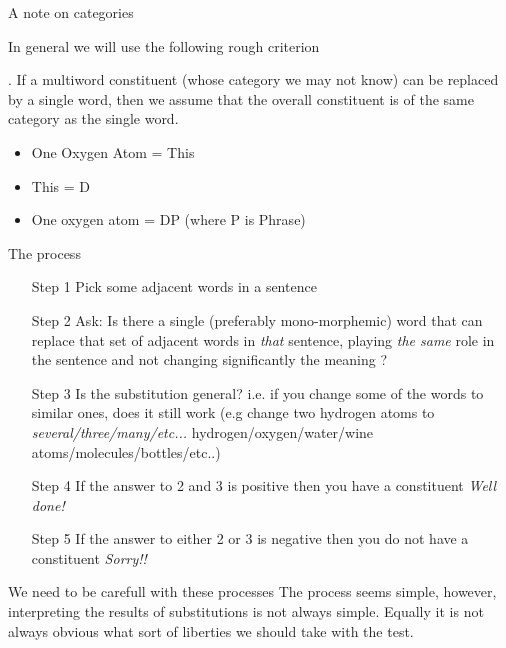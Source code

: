 \begin{frame}
 {A note on categories}

In general we will use the following rough criterion

\ex.
If a multiword constituent (whose category we may not know) can be replaced by a single word, then we assume that the overall constituent is of the same category as the single word.  

\begin{itemize}
\item One Oxygen Atom = This
\item This = D
\item One oxygen atom = DP (where P is Phrase)
\end{itemize}

\end{frame}


\begin{frame}
  {The process}
\begin{itemize}
\item[Step 1] Pick some adjacent words in a sentence
\item[Step 2] Ask: Is there a single (preferably mono-morphemic) word that can replace that set of adjacent words in \textit{that} sentence, playing \textit{the same} role in the sentence and not changing significantly the meaning ? 
\item[Step 3] Is the substitution general?  i.e. if you change some of the words to similar ones, does it still work (e.g change two hydrogen atoms to \textit{several/three/many/etc...} hydrogen/oxygen/water/wine atoms/molecules/bottles/etc..)
\item[Step 4] If the answer to 2 and 3 is positive then you have a constituent \pause \textit{Well done!}
\item[Step 5] If the answer to either 2 or 3 is negative then you do not have a constituent \pause \textit{Sorry!!}
\end{itemize}

\end{frame}


\begin{frame}
{We need to be carefull with these processes}
  The process seems simple, however, interpreting the results of substitutions is not always simple.  Equally it is not always obvious what sort of liberties we should take with the test.
\end{frame}


